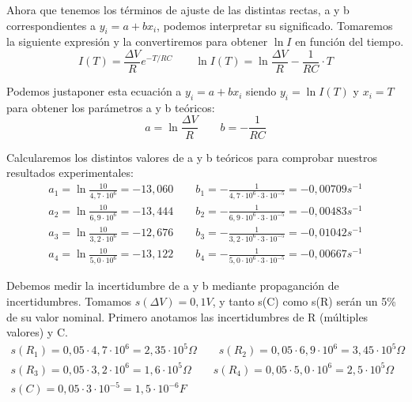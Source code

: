 \documentclass[12pt, a4paper, titlepage]{article}
\begin{document}
  Ahora que tenemos los términos de ajuste de las distintas rectas, a y b correspondientes a $y_i = a + bx_i$, podemos interpretar su significado. Tomaremos la siguiente expresión y la convertiremos para obtener $\ln{I}$ en función del tiempo.
  \begin{equation}
    I(T) = \frac{\Delta V}{R} e^{-T/RC} \qquad \ln{I(T)} = \ln{\frac{\Delta V}{R}} - \frac{1}{RC} \cdot T \label{ec:I}
  \end{equation}

  Podemos justaponer esta ecuación a $y_i = a + bx_i$ siendo $y_i = \ln{I(T)}$ y $x_i = T$ para obtener los parámetros a y b teóricos:
  \begin{equation}
    a = \ln{\frac{\Delta V}{R}} \qquad b = - \frac{1}{RC} \label{ec:abteo}
  \end{equation}

  Calcularemos los distintos valores de a y b teóricos para comprobar nuestros resultados experimentales:
  \begin{gather*}
    a_1 = \ln{\frac{10}{4,7 \cdot 10^6}} = -13,060 \qquad b_1 = - \frac{1}{4,7 \cdot 10^6 \cdot 3 \cdot 10^{-5}} = -0,00709 s^{-1} \\
    a_2 = \ln{\frac{10}{6,9 \cdot 10^6}} = -13,444 \qquad b_2 = - \frac{1}{6,9 \cdot 10^6 \cdot 3 \cdot 10^{-5}} = -0,00483 s^{-1} \\
    a_3 = \ln{\frac{10}{3,2 \cdot 10^6}} = -12,676 \qquad b_3 = - \frac{1}{3,2 \cdot 10^6 \cdot 3 \cdot 10^{-5}} = -0,01042 s^{-1} \\
    a_4 = \ln{\frac{10}{5,0 \cdot 10^6}} = -13,122 \qquad b_4 = - \frac{1}{5,0 \cdot 10^6 \cdot 3 \cdot 10^{-5}} = -0,00667 s^{-1}
  \end{gather*}

  Debemos medir la incertidumbre de a y b mediante propaganción de incertidumbres. Tomamos $s(\Delta V) = 0,1V$, y tanto s(C) como s(R) serán un 5\% de su valor nominal. Primero anotamos las incertidumbres de R (múltiples valores) y C.
  \begin{gather}
    s(R_1) = 0,05 \cdot 4,7 \cdot 10^6 = 2,35 \cdot 10^5 \Omega \qquad s(R_2) = 0,05 \cdot 6,9 \cdot 10^6 = 3,45 \cdot 10^5 \Omega \nonumber \\
    s(R_3) = 0,05 \cdot 3,2 \cdot 10^6 = 1,6 \cdot 10^5 \Omega \qquad s(R_4) = 0,05 \cdot 5,0 \cdot 10^6 = 2,5 \cdot 10^5 \Omega \nonumber \\
    s(C) = 0,05 \cdot 3 \cdot 10^{-5} = 1,5 \cdot 10^{-6} F \nonumber
  \end{gather}
\end{document}
